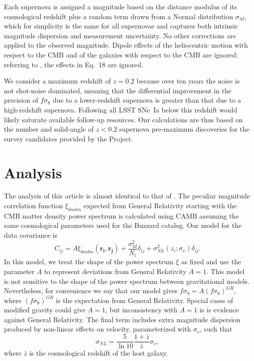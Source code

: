 \documentclass{aastex62}   	%
\begin{document}
Each supernova is assigned a magnitude based on the distance modulus of its cosmological
redshift plus a random term drawn from a Normal distribution $\sigma_M$, which for simplicity is the same for all supernovae and captures both
intrinsic magnitude dispersion and measurement uncertainty.  No other corrections are applied to the observed magnitude.  Dipole effects of the heliocentric
motion with respect to the CMB and of the galaxies with respect to the CMB  are ignored: referring to
\citet{2011ApJ...741...67D}, the effects in Eq.~18 are ignored.

We consider a maximum redshift of $z=0.2$ because over ten years the noise is not shot-noise dominated, meaning that the differential improvement
in the precision of
$f\sigma_8$ due to a lower-redshift supernova is greater than that due to a high-redshift supernova.  Following all LSST SNe~Ia below this redshift 
would likely saturate available follow-up resources.
Our calculations are thus based on the number and solid-angle of $z<0.2$ supernova pre-maximum discoveries 
for the survey candidates provided by the Project. 


\section{Analysis}
The analysis of this article is  almost identical to that of \citet{2015JCAP...12..033H, 2017JCAP...05..015H}.   The peculiar magnitude correlation
function $\xi_{\delta m \delta m}$ expected from General Relativity starting with the CMB
matter density power spectrum is calculated using CAMB \citep{Lewis:2002ah}  assuming the same
cosmological parameters used for the Buzzard catalog.  Our model for the data covariance
is
\begin{equation}
C_{ij} = A\xi_{\delta m \delta m}(\mathbf{r_i},\mathbf{r_j}) + \frac{\sigma_M^2}{N_i} \delta_{ij} + \sigma^2_{NL}(z_i;\sigma_{v})\delta_{ij}.
\end{equation}
In this model, we treat the shape of the power spectrum $\xi$ as fixed and use the parameter $A$ to represent
deviations from General Relativity $A=1$.  This model is not sensitive to  the shape of
the power spectrum between gravitational models.  Nevertheless, for
convenience we say that our model gives $f\sigma_8 = A (f\sigma_8)^{GR}$, where $(f\sigma_8)^{GR}$ is the expectation
from General Relativity.  Special cases of modified gravity could give $A=1$, but inconsistency with $A=1$ is is evidence against General Relativity.
The final term includes extra magnitude dispersion produced by non-linear effects on velocity, parameterized with $\sigma_{v}$, such that
\begin{equation}
\sigma_{NL} = \frac{5}{\ln{10}} \frac{1+\bar{z}}{\bar{z}} \sigma_v,
\end{equation}
where $\bar{z}$ is the cosmological redshift of the host galaxy.
\end{document}
